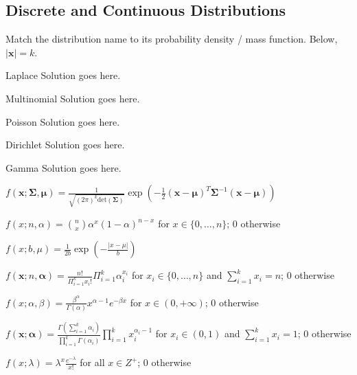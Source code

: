 \documentclass[a4paper]{article}
\theoremstyle{definition}
\newcommand{\vc}[1]{\boldsymbol{#1}}
\newcommand{\xv}{\vc{x}}
\newcommand{\Sigmav}{\vc{\Sigma}}
\newcommand{\alphav}{\vc{\alpha}}
\newcommand{\muv}{\vc{\mu}}
\newenvironment{soln}{
    \leavevmode\color{blue}\ignorespaces
}{}
\begin{document}
\subsection{Discrete and Continuous Distributions}
Match the distribution name to its probability density / mass
function. Below, $|\xv| = k$.
\begin{enumerate}[(a)]
\begin{minipage}{0.3\linewidth}
    \item Laplace \begin{soln}  Solution goes here. \end{soln}
    \item Multinomial \begin{soln}  Solution goes here. \end{soln}
    \item Poisson \begin{soln}  Solution goes here. \end{soln}
    \item Dirichlet \begin{soln}  Solution goes here. \end{soln}
    \item Gamma \begin{soln}  Solution goes here. \end{soln}
\end{minipage}
\begin{minipage}{0.5\linewidth}
    \item $f(\xv; \Sigmav, \muv) = \frac{1}{\sqrt{(2\pi)^k \mathrm{det}(\Sigmav) }} \exp\left( -\frac{1}{2}
        (\xv - \muv)^T \Sigmav^{-1} (\xv - \muv)  \right)$
    \item $f(x; n, \alpha) = \binom{n}{x} \alpha^x (1 - \alpha)^{n-x}$
      for $x \in \{0,\ldots, n\}$; $0$ otherwise
    \item $f(x; b, \mu) = \frac{1}{2b} \exp\left( - \frac{|x - \mu|}{b} \right)$
    \item $f(\xv; n, \alphav) = \frac{n!}{\Pi_{i=1}^k x_i!}
      \Pi_{i=1}^k \alpha_i^{x_i}$ for $x_i \in \{0,\ldots,n\}$ and
      $\sum_{i=1}^k x_i = n$; $0$ otherwise
    \item $f(x; \alpha, \beta) = \frac{\beta^{\alpha}}{\Gamma(\alpha)} x^{\alpha -
        1}e^{-\beta x}$ for $x \in (0,+\infty)$; $0$ otherwise
    \item $f(\xv; \alphav) = \frac{\Gamma(\sum_{i=1}^k
        \alpha_i)}{\prod_{i=1}^k \Gamma(\alpha_i)} \prod_{i=1}^{k}
      x_i^{\alpha_i - 1}$ for $x_i \in (0,1)$ and $\sum_{i=1}^k x_i =
      1$; 0 otherwise
    \item $f(x; \lambda) = \lambda^x \frac{e^{-\lambda}}{x!}$ for all
      $x \in Z^+$; $0$ otherwise
\end{minipage}
\end{enumerate}
        
\end{document}
